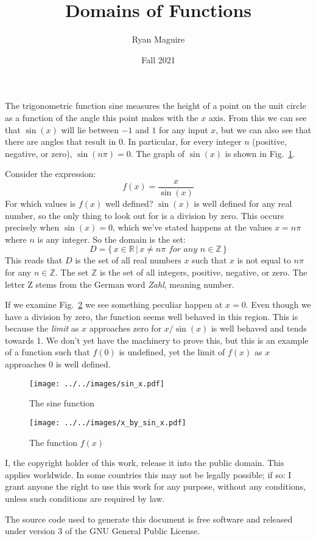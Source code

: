 \documentclass{article}
\title{Domains of Functions}
\author{Ryan Maguire}
\date{Fall 2021}
\begin{document}
    \maketitle
    The trigonometric function sine measures the height of a point on the
    unit circle as a function of the angle this point makes with the $x$ axis.
    From this we can see that $\sin(x)$ will lie between $-1$ and $1$ for any
    input $x$, but we can also see that there are angles that result in
    $0$. In particular, for every integer $n$ (positive, negative, or zero),
    $\sin(n\pi)=0$. The graph of $\sin(x)$ is shown in
    Fig.~\ref{fig:sin_x}.
    \par\hfill\par
    Consider the expression:
    \begin{equation}
        f(x)=\frac{x}{\sin(x)}
    \end{equation}
    For which values is $f(x)$ well defined? $\sin(x)$ is well defined for any
    real number, so the only thing to look out for is a division by zero.
    This occurs precisely when $\sin(x)=0$, which we've stated happens at the
    values $x=n\pi$ where $n$ is any integer. So the domain is the set:
    \begin{equation}
        D=\{\,x\in\mathbb{R}\,|\,x\ne{n\pi}\textit{ for any }n\in\mathbb{Z}\,\}
    \end{equation}
    This reads that $D$ is the set of all real numbers $x$ such that $x$ is
    not equal to $n\pi$ for any $n\in\mathbb{Z}$. The set $\mathbb{Z}$ is the
    set of all integers, positive, negative, or zero. The letter Z stems from
    the German word \textit{Zahl}, meaning number.
    \par\hfill\par
    If we examine Fig.~\ref{fig:x_by_sin_x} we see something peculiar happen
    at $x=0$. Even though we have a division by zero, the function seems well
    behaved in this region. This is because the \textit{limit} as $x$
    approaches zero for $x/\sin(x)$ is well behaved and tends towards 1. We
    don't yet have the machinery to prove this, but this is an example of a
    function such that $f(0)$ is undefined, yet the limit of $f(x)$ as $x$
    approaches 0 is well defined.
    \begin{figure}
        \centering
        \texttt{[image: ../../images/sin\_x.pdf]}
        \caption{The sine function}
        \label{fig:sin_x}
    \end{figure}
    \begin{figure}
        \centering
        \texttt{[image: ../../images/x\_by\_sin\_x.pdf]}
        \caption{The function $f(x)$}
        \label{fig:x_by_sin_x}
    \end{figure}
    \newpage
    I, the copyright holder of this work, release it into the public domain.
    This applies worldwide. In some countries this may not be legally possible;
    if so: I grant anyone the right to use this work for any purpose, without
    any conditions, unless such conditions are required by law.
    \par\hfill\par
    The source code used to generate this document is free software and released
    under version 3 of the GNU General Public License.
\end{document}
